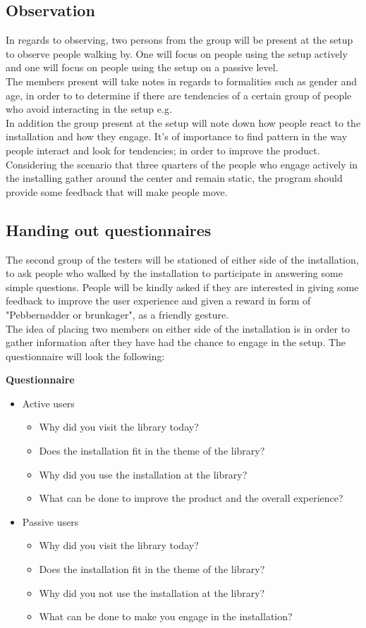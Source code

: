 \subsection{Observation}
In regards to observing, two persons from the group will be present at the setup to observe people walking by. One will focus on people using the setup actively and one will focus on people using the setup on a passive level.\\
The members present will take notes in regards to formalities such as gender and age, in order to to determine if there are tendencies of a certain group of people who avoid interacting in the setup e.g.\\
In addition the group present at the setup will note down how people react to the installation and how they engage. It's of importance to find pattern in the way people interact and look for tendencies; in order to improve the product. Considering the scenario that three quarters of the people who engage actively in the installing gather around the center and remain static, the program should provide some feedback that will make people move.

\subsection{Handing out questionnaires}
The second group of the testers will be stationed of either side of the installation, to ask people who walked by the installation to participate in answering some simple  questions. People will be kindly asked if they are interested in giving some feedback to improve the user experience and given a reward in form of "Pebbern{\o}dder or brunkager", as a friendly gesture.\\
The idea of placing two members on either side of the installation is in order to gather information after they have had the chance to engage in the setup. The questionnaire will look the following:

\textbf{Questionnaire}
\begin{itemize}
\item Active users
\begin{itemize}
\item Why did you visit the library today?
\item Does the installation fit in the theme of the library?
\item Why did you use the installation at the library?
\item What can be done to improve the product and the overall experience?
\end{itemize}
\item Passive users
\begin{itemize}
\item Why did you visit the library today?
\item Does the installation fit in the theme of the library?
\item Why did you not use the installation at the library?
\item What can be done to make you engage in the installation?
\end{itemize}
\end{itemize}


